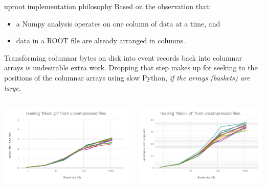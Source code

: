 \documentclass[aspectratio=169]{beamer}
\begin{document}


\begin{frame}{uproot implementation philosophy}
\vspace{0.4 cm}
Based on the observation that:
\begin{itemize}
\item a Numpy analysis operates on one column of data at a time, and
\item data in a ROOT file are already arranged in columns.
\end{itemize}

\vspace{0.25 cm}
Transforming columnar bytes on disk into event records back into columnar arrays is undesirable extra work. Dropping that step makes up for seeking to the positions of the columnar arrays using slow Python, {\it if the arrays (baskets) are large.}

\begin{columns}
\includegraphics[width=\linewidth]{root-none-muon.png}

\includegraphics[width=\linewidth]{rootnumpy-none-muon.png}
\end{columns}
\end{frame}
\end{document}
